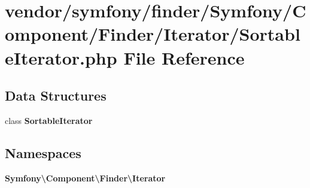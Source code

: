 \section{vendor/symfony/finder/\+Symfony/\+Component/\+Finder/\+Iterator/\+Sortable\+Iterator.php File Reference}
\label{_sortable_iterator_8php}
\subsection*{Data Structures}
\begin{DoxyCompactItemize}
\item 
class {\bf Sortable\+Iterator}
\end{DoxyCompactItemize}
\subsection*{Namespaces}
\begin{DoxyCompactItemize}
\item 
 {\bf Symfony\textbackslash{}\+Component\textbackslash{}\+Finder\textbackslash{}\+Iterator}
\end{DoxyCompactItemize}
